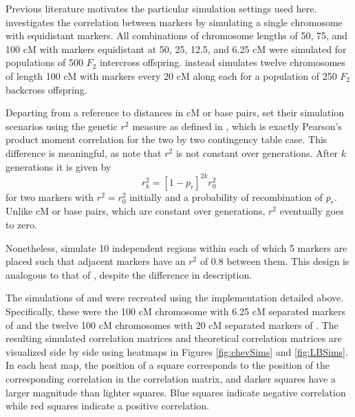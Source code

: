 \documentclass[sts]{imsart}
\begin{document}
Previous literature motivates the particular simulation settings used here. \cite{cheverud2001} investigates the correlation between markers by simulating a single chromosome with equidistant markers. All combinations of chromosome lengths of 50, 75, and 100 cM with markers equidistant at 50, 25, 12.5, and 6.25 cM were simulated for populations of 500 $F_2$ intercross offspring. \cite{LanderBotstein1989} instead simulates twelve chromosomes of length 100 cM with markers every 20 cM along each for a population of 250 $F_2$ backcross offspring.

Departing from a reference to distances in cM or base pairs, \cite{LiJi2005} set their simulation scenarios using the genetic $r^2$ measure as defined in \cite{hillrobertson1968}, which is exactly Pearson's product moment correlation for the two by two contingency table case.
This difference is meaningful, as \cite{siegmundyakir2007} note that $r^2$ is not constant over generations. After $k$ generations it is given by
$$r_k^2 = \left [ 1 - p_r \right ]^{2k}  r^2_0$$
for two markers with $r^2 = r^2_0$ initially and a probability of recombination of $p_r$. Unlike cM or base pairs, which are constant over generations, $r^2$ eventually goes to zero.

Nonetheless, \cite{LiJi2005} simulate 10 independent regions within each of which 5 markers are placed such that adjacent markers have an $r^2$ of 0.8 between them. This design is analogous to that of \cite{LanderBotstein1989}, despite the difference in description.

The simulations of \cite{cheverud2001} and \cite{LanderBotstein1989} were recreated using the implementation detailed above. Specifically, these were the 100 cM chromosome with 6.25 cM separated markers of \cite{cheverud2001} and the twelve 100 cM chromosomes with 20 cM separated markers of \cite{LanderBotstein1989}. The resulting simulated correlation matrices and theoretical correlation matrices are visualized side by side using heatmaps in Figures \ref{fig:chevSims} and \ref{fig:LBSims}. In each heat map, the position of a square corresponds to the position of the corresponding correlation in the correlation matrix, and darker squares have a larger magnitude than lighter squares. Blue squares indicate negative correlation while red squares indicate a positive correlation.
\end{document}
